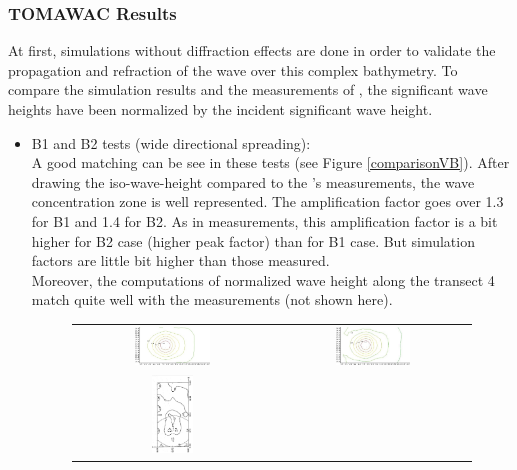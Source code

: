 \subsubsection{TOMAWAC Results }
At first, simulations without diffraction effects are done in order to validate the propagation and refraction of the wave over this complex bathymetry. To compare the simulation results and the measurements of \cite{vincent}, the significant wave heights have been normalized by the incident significant wave height.\\
\begin{itemize}
\item B1 and B2 tests (wide directional spreading):\\
A good matching can be see in these tests (see Figure \ref{comparisonVB}). After drawing the iso-wave-height compared to the \cite{vincent}'s measurements, the wave concentration zone is well represented. The amplification factor goes over 1.3 for B1 and 1.4 for B2. As in measurements, this amplification factor is a bit higher for B2 case (higher peak factor) than for B1 case. But simulation factors are little bit higher than those measured.\\
Moreover, the computations of normalized wave height along the transect 4 match quite well with the measurements (not shown here).\\
\begin{figure}[H]
  \centering
  \begin{tabular}{cc}
  	\includegraphics[width=0.4\textwidth]{iso-B1.jpg}&\includegraphics[width=0.4\textwidth]{iso-B2.jpg}\\
  	\includegraphics[width=0.22\textwidth,angle=-90]{B1_m.JPG}

\end{tabular}
\end{figure}
\end{itemize}
